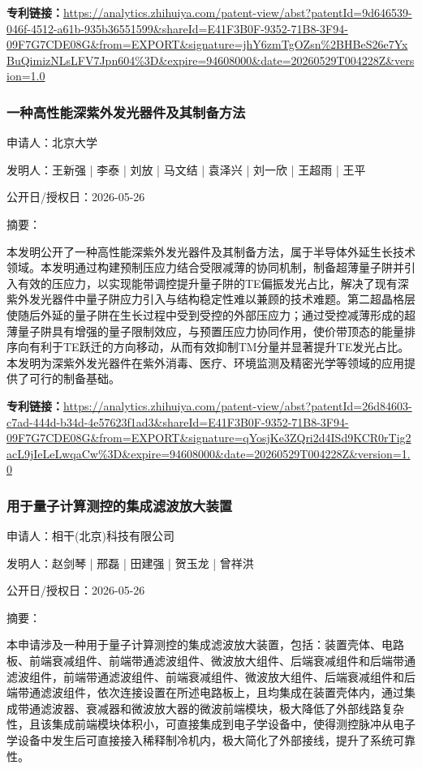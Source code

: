 \documentclass[12pt,a4paper]{ctexart}
\begin{document}
\noindent\textbf{专利链接：}\url{https://analytics.zhihuiya.com/patent-view/abst?patentId=9d646539-046f-4512-a61b-935b36551599&shareId=E41F3B0F-9352-71B8-3F94-09F7G7CDE08G&from=EXPORT&signature=jhY6zmTgOZsn%2BHBeS26e7YxBuQimizNLsLFV7Jpn604%3D&expire=94608000&date=20260529T004228Z&version=1.0}

\subsubsection{ 一种高性能深紫外发光器件及其制备方法 }

申请人：北京大学

发明人：王新强 | 李泰 | 刘放 | 马文结 | 袁泽兴 | 刘一欣 | 王超雨 | 王平

公开日/授权日：2026-05-26

摘要：

本发明公开了一种高性能深紫外发光器件及其制备方法，属于半导体外延生长技术领域。本发明通过构建预制压应力结合受限减薄的协同机制，制备超薄量子阱并引入有效的压应力，以实现能带调控提升量子阱的TE偏振发光占比，解决了现有深紫外发光器件中量子阱应力引入与结构稳定性难以兼顾的技术难题。第二超晶格层使随后外延的量子阱在生长过程中受到受控的外部压应力；通过受控减薄形成的超薄量子阱具有增强的量子限制效应，与预置压应力协同作用，使价带顶态的能量排序向有利于TE跃迁的方向移动，从而有效抑制TM分量并显著提升TE发光占比。本发明为深紫外发光器件在紫外消毒、医疗、环境监测及精密光学等领域的应用提供了可行的制备基础。

\noindent\textbf{专利链接：}\url{https://analytics.zhihuiya.com/patent-view/abst?patentId=26d84603-c7ad-444d-b34d-4e57623f1ad3&shareId=E41F3B0F-9352-71B8-3F94-09F7G7CDE08G&from=EXPORT&signature=qYosjKe3ZQri2d4ISd9KCR0rTig2acL9jIeLeLwqaCw%3D&expire=94608000&date=20260529T004228Z&version=1.0}

\subsubsection{ 用于量子计算测控的集成滤波放大装置 }

申请人：相干(北京)科技有限公司

发明人：赵剑琴 | 邢磊 | 田建强 | 贺玉龙 | 曾祥洪

公开日/授权日：2026-05-26

摘要：

本申请涉及一种用于量子计算测控的集成滤波放大装置，包括：装置壳体、电路板、前端衰减组件、前端带通滤波组件、微波放大组件、后端衰减组件和后端带通滤波组件，前端带通滤波组件、前端衰减组件、微波放大组件、后端衰减组件和后端带通滤波组件，依次连接设置在所述电路板上，且均集成在装置壳体内，通过集成带通滤波器、衰减器和微波放大器的微波前端模块，极大降低了外部线路复杂性，且该集成前端模块体积小，可直接集成到电子学设备中，使得测控脉冲从电子学设备中发生后可直接接入稀释制冷机内，极大简化了外部接线，提升了系统可靠性。
\end{document}
